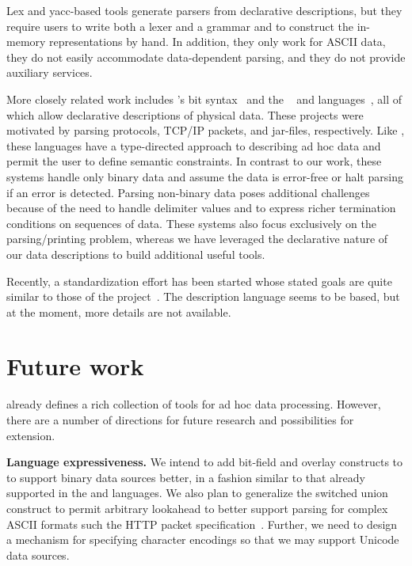 \documentclass[times]{acm-sigplan}
\begin{document}
Lex and yacc-based tools generate parsers from declarative descriptions, but 
they require users to write both a lexer and a grammar and to construct the in-memory representations by hand.  In addition, they only work for ASCII data,  they do not easily accommodate data-dependent parsing, and they do not provide auxiliary services. 

More closely related work includes \erlang{}'s bit syntax~\cite{erlang} and
the \packettypes{}~\cite{sigcomm00} and
\datascript{} languages~\cite{gpce02}, 
all of which allow declarative descriptions of physical data.  These projects were motivated by parsing protocols,
\textsc{TCP/IP} packets, and \java{} jar-files, respectively.  Like
\pads{}, these languages have a type-directed approach to
describing ad hoc data and permit the user to define semantic constraints.
In contrast to our
work, these systems handle only binary data and assume the data is
error-free or halt parsing if an error is detected. 
Parsing non-binary data poses additional challenges because of the need
to handle delimiter values and to express richer termination conditions
on sequences of data. These systems also
focus exclusively on the parsing/printing problem, whereas we have 
leveraged the declarative nature of
our data descriptions to build additional useful tools.


Recently, a standardization effort has been started whose stated goals are quite similar to those of the \pads{} project~\cite{dfdl}. The description
language seems to be \xml{} based, but at the moment, more details are 
not available.

\section{Future work}
\pads{} already defines a rich collection of tools for ad hoc data processing.
However, there are a number of directions for future research and possibilities for extension. 

\textbf{Language expressiveness.}  
We intend to add bit-field 
and overlay constructs to \pads{} to support binary data sources better,
in a fashion similar to that already supported in the \datascript{} and \packettypes{} languages.
We also plan to generalize the switched union construct to permit arbitrary lookahead to better support
parsing for complex ASCII formats such the HTTP packet specification~\cite{http}.  Further, we need to design a mechanism
for specifying character encodings so that we may support 
Unicode~\cite{unicode} data sources.
\end{document}
